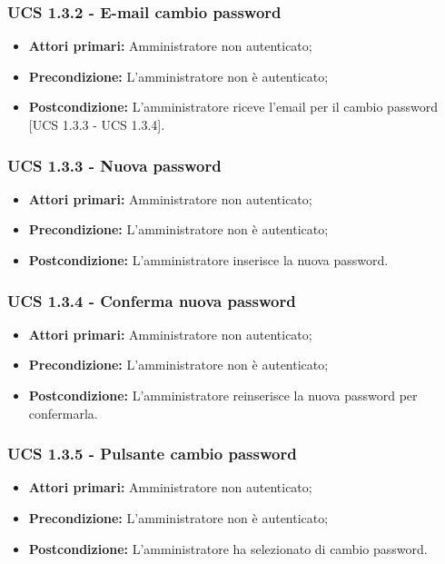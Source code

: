 \subsubsection{UCS 1.3.2 - E-mail cambio password}
\begin{itemize}
\item \textbf{Attori primari:} Amministratore non autenticato;
\item \textbf{Precondizione:} L'amministratore non è autenticato;
\item \textbf{Postcondizione:} L'amministratore riceve l'email per il cambio password [UCS 1.3.3 - UCS 1.3.4].
\end{itemize}

\subsubsection{UCS 1.3.3 - Nuova password}
\begin{itemize}
\item \textbf{Attori primari:} Amministratore non autenticato;
\item \textbf{Precondizione:}  L'amministratore non è autenticato;
\item \textbf{Postcondizione:} L'amministratore inserisce la nuova password.
\end{itemize}

\subsubsection{UCS 1.3.4 - Conferma nuova password}
\begin{itemize}
\item \textbf{Attori primari:} Amministratore non autenticato;
\item \textbf{Precondizione:} L'amministratore non è autenticato;
\item \textbf{Postcondizione:} L'amministratore reinserisce la nuova password per confermarla.
\end{itemize}

\subsubsection{UCS 1.3.5 - Pulsante cambio password}%
\begin{itemize}
\item \textbf{Attori primari:} Amministratore non autenticato;
\item \textbf{Precondizione:} L'amministratore non è autenticato;
\item \textbf{Postcondizione:} L'amministratore ha selezionato di cambio password.
\end{itemize}

